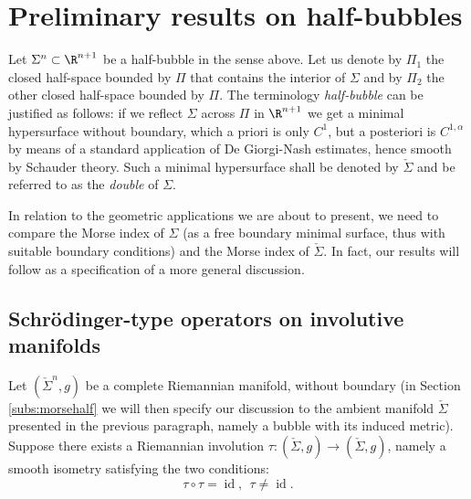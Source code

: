 \section{Preliminary results on half-bubbles}\label{sec:prelim}
        
        
        	Let $\Sigma^n\subset \R^{n+1}$ be a half-bubble in the sense above. Let us denote by $\Pi_1$ the closed half-space bounded by $\Pi$ that contains the interior of $\Sigma$ and by $\Pi_2$ the other closed half-space bounded by $\Pi$. The terminology \textsl{half-bubble} can be justified as follows: if we reflect $\Sigma$ across $\Pi$ in $\R^{n+1}$ we get a minimal hypersurface without boundary, which a priori is only $C^1$, but a posteriori is $C^{1,\alpha}$ by means of a standard application of De Giorgi-Nash estimates, hence smooth by Schauder theory. Such a minimal hypersurface shall be denoted by $\check{\Sigma}$ and be referred to as the \textsl{double} of $\Sigma$.
        	
        	
        	In relation to the geometric applications we are about to present, we need to compare the Morse index of $\Sigma$ (as a free boundary minimal surface, thus with suitable boundary conditions) and the Morse index of $\check{\Sigma}$. In fact, our results will follow as a specification of a more general discussion.
        
     
        	
        	\subsection{Schr\"odinger-type operators on involutive manifolds}\label{subs:general}
        	
        	Let $(\check{\Sigma}^{n},g)$ be a complete Riemannian manifold, without boundary (in Section \ref{subs:morsehalf} we will then specify our discussion to the ambient manifold $\check{\Sigma}$ presented in the previous paragraph, namely a bubble with its induced metric). Suppose there exists a Riemannian involution $\tau:(\check{\Sigma},g) \to (\check{\Sigma},g)$, namely a smooth isometry satisfying the two conditions:
        	\[
        	\tau\circ\tau = \operatorname{id}, \ \ \tau\neq \operatorname{id}.
        	\] 
        	
